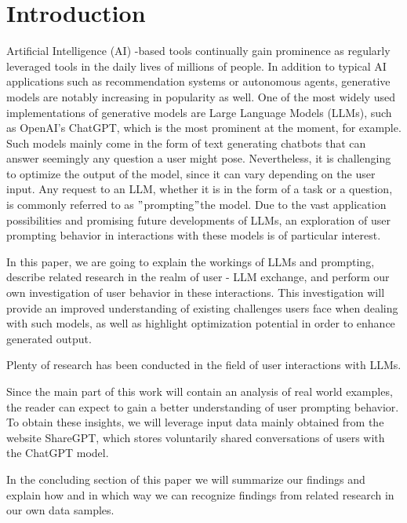 
\section{Introduction}
\label{sec:introduction}

\sloppy %
Artificial Intelligence (AI) -based tools continually gain prominence as regularly leveraged tools in the
daily lives of millions of people.
In addition to typical AI applications such as recommendation systems or autonomous agents, generative
models are notably increasing in popularity as well.
One of the most widely used implementations of generative models are Large Language Models (LLMs),
such as OpenAI's ChatGPT, which is the most prominent at the moment, for example. %
Such models mainly come in the form of text generating chatbots that can answer seemingly any question
a user might pose.
Nevertheless, it is challenging to optimize the output of the model, since it can vary depending
on the user input. %
Any request to an LLM, whether it is in the form of a task or a question, is commonly referred to as
\("\)prompting\("\)the model.
Due to the vast application possibilities and promising future developments of LLMs,
an exploration of user prompting behavior in interactions with these models is of particular interest.

In this paper, we are going to explain the workings of LLMs and prompting, describe related research
in the realm of user - LLM exchange, and perform our own investigation of user behavior in these
interactions.
This investigation will provide an improved understanding of existing challenges users face when
dealing with such models, as well as highlight optimization potential in order to enhance generated
output.

Plenty of research has been conducted in the field of user interactions with LLMs.


Since the main part of this work will contain an analysis of real world examples, the reader can
expect to gain a better understanding of user prompting behavior.
To obtain these insights, we will leverage input data mainly obtained from the website
ShareGPT, %
which stores voluntarily shared conversations of users with the ChatGPT model. %

In the concluding section of this paper we will summarize our findings and explain how and in which way
we can recognize findings from related research in our own data samples.